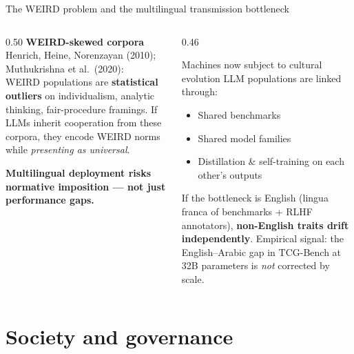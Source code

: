 \documentclass[11pt,aspectratio=169]{beamer}
\newcommand{\takeaway}[1]{%
  \begin{center}
    \colorbox{rsnavy!10}{%
      \begin{minipage}{0.92\textwidth}
        \centering\textbf{#1}
      \end{minipage}}
  \end{center}}
\begin{document}
\begin{frame}{The WEIRD problem and the multilingual transmission bottleneck}
    \large
    \begin{columns}[T]
        \begin{column}{0.50\textwidth}
            \textbf{WEIRD-skewed corpora}\\
            \footnotesize Henrich, Heine, Norenzayan (2010); Muthukrishna et al.\ (2020):\\[4pt]
            \normalsize WEIRD populations are \textbf{statistical outliers} on individualism, analytic thinking, fair-procedure framings.
            \vspace{0.3cm}
            If LLMs inherit cooperation from these corpora, they encode WEIRD norms while \emph{presenting as universal}.
            \vspace{0.3cm}
            \takeaway{Multilingual deployment risks normative imposition --- not just performance gaps.}
        \end{column}
        \begin{column}{0.46\textwidth}
            \begin{alertblock}{Machines now subject to cultural evolution}
                \footnotesize LLM populations are linked through:
                \begin{itemize}
                    \item Shared benchmarks
                    \item Shared model families
                    \item Distillation \& self-training on each other's outputs
                \end{itemize}
                \vspace{0.2cm}
                If the bottleneck is English (lingua franca of benchmarks + RLHF annotators), \textbf{non-English traits drift independently}.
                \vspace{0.2cm}
                Empirical signal: the English--Arabic gap in TCG-Bench at 32B parameters is \emph{not} corrected by scale.
            \end{alertblock}
        \end{column}
    \end{columns}
\end{frame}

\section{Society and governance}
\end{document}

